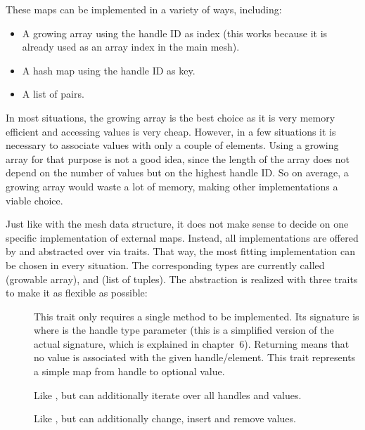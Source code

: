 These maps can be implemented in a variety of ways, including:

\begin{itemize}
\item A growing array using the handle ID as index (this works because it is already used as an array index in the main mesh).
\item A hash map using the handle ID as key.
\item A list of  pairs.
\end{itemize}

In most situations, the growing array is the best choice as it is very memory efficient and accessing values is very cheap.
However, in a few situations it is necessary to associate values with only a couple of elements.
Using a growing array for that purpose is not a good idea, since the length of the array does not depend on the number of values but on the highest handle ID.
So on average, a growing array would waste a lot of memory, making other implementations a viable choice.

Just like with the mesh data structure, it does not make sense to decide on one specific implementation of external maps.
Instead, all implementations are offered by  and abstracted over via traits.
That way, the most fitting implementation can be chosen in every situation.
The corresponding types are currently called  (growable array),  and  (list of tuples).
The abstraction is realized with three traits to make it as flexible as possible:

\begin{description}
  \item [] This trait only requires a single method to be implemented.
  Its signature is  where  is the handle type parameter (this is a simplified version of the actual signature, which is explained in chapter~6).
  Returning  means that no value is associated with the given handle/element.
  This trait represents a simple map from handle to optional value.
  \item [] Like , but can additionally iterate over all handles and values.
  \item [] Like , but can additionally change, insert and remove values.
\end{description}

